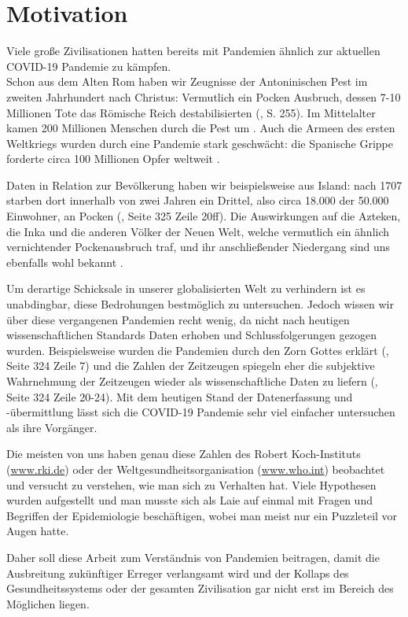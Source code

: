 \chapter{Motivation}\label{chap:Motivation}
Viele große Zivilisationen hatten bereits mit Pandemien ähnlich zur aktuellen COVID-19 Pandemie zu kämpfen.\\
Schon aus dem Alten Rom haben wir Zeugnisse der Antoninischen Pest im zweiten Jahrhundert nach Christus: Vermutlich ein Pocken Ausbruch, dessen 7-10 Millionen Tote das Römische Reich destabilisierten (\autocite{RomPest}, S. 255).
Im Mittelalter kamen 200 Millionen Menschen durch die Pest um \autocite{PestMittelalter}.
Auch die Armeen des ersten Weltkriegs wurden durch eine Pandemie stark geschwächt: die Spanische Grippe forderte circa 100 Millionen Opfer weltweit \autocite{SpanischeGrippe}.

Daten in Relation zur Bevölkerung haben wir beispielsweise aus Island: nach 1707 starben dort innerhalb von zwei Jahren ein Drittel, also circa  18.000 der 50.000 Einwohner, an Pocken (\autocite{americaPandemics}, Seite 325 Zeile 20ff). Die Auswirkungen auf die Azteken, die Inka und die anderen Völker der Neuen Welt, welche vermutlich ein ähnlich vernichtender Pockenausbruch traf, und ihr anschließender Niedergang sind uns ebenfalls wohl bekannt \autocite{americaPandemics}.

Um derartige Schicksale in unserer globalisierten Welt zu verhindern ist es unabdingbar, diese Bedrohungen bestmöglich zu untersuchen.
Jedoch wissen wir über diese vergangenen Pandemien recht wenig, da nicht nach heutigen wissenschaftlichen Standards Daten erhoben und Schlussfolgerungen gezogen wurden. Beispielsweise wurden die Pandemien durch den Zorn Gottes erklärt (\autocite{americaPandemics}, Seite 324 Zeile 7) und die Zahlen der Zeitzeugen spiegeln eher die subjektive Wahrnehmung der Zeitzeugen wieder als wissenschaftliche Daten zu liefern (\autocite{americaPandemics}, Seite 324 Zeile 20-24). Mit dem heutigen Stand der Datenerfassung und -übermittlung lässt sich die COVID-19 Pandemie sehr viel einfacher untersuchen als ihre Vorgänger.

Die meisten von uns haben genau diese Zahlen des Robert Koch-Instituts (\href{www.rki.de}{www.rki.de}) oder der Weltgesundheitsorganisation (\href{www.who.int}{www.who.int}) beobachtet und versucht zu verstehen, wie man sich zu Verhalten hat. Viele Hypothesen wurden aufgestellt und man musste sich als Laie auf einmal mit Fragen und Begriffen der Epidemiologie beschäftigen, wobei man meist nur ein Puzzleteil vor Augen hatte.

Daher soll diese Arbeit zum Verständnis von Pandemien beitragen, damit die Ausbreitung zukünftiger Erreger verlangsamt wird und der Kollaps des Gesundheitssystems oder der gesamten Zivilisation gar nicht erst im Bereich des Möglichen liegen.